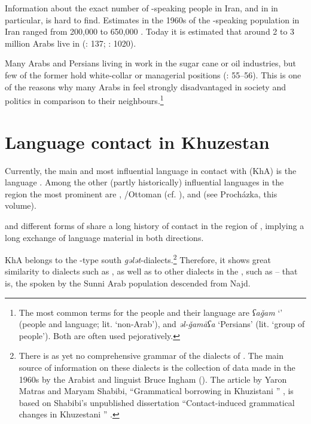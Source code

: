 \documentclass[output=paper,nonflat]{langsci/langscibook}
\begin{document}
In{formation} about the exact number of -speaking people in Iran, and in  in particular, is hard to find. Estimates in the 1960s of the -speaking population in Iran ranged from 200,000 to 650,000 \citep[216]{Oberling1986}. Today it is estimated that around 2 to 3 million Arabs live in  (\citealt{MatrasShabibi2007}: 137; \citealt{Gazsi2011}: 1020). 

Many Arabs and Persians living in  work in the sugar cane or oil industries, but few of the former hold white-collar or managerial positions (\citealt{DePlanhol1986}: 55–56). This is one of the reasons why many Arabs in  feel strongly disadvantaged in society and politics in comparison to their  neighbours.\footnote{The most common   terms for the  people and their language are \textit{ʕaǧam} ‘' (people and language; lit. `non-Arab'), and \textit{əl-ǧamāʕa} ‘Persians’ (lit. `group of people'). Both are often used pejoratively.} 

\section{Language contact in Khuzestan}

Currently, the main and most influential language in contact with   (KhA) is the   language . Among the other (partly historically) influential languages in the region the most prominent are , /Ottoman (cf. \citealt{Ingham2005}), and  (see Procházka, this volume).

 and different forms of  share a long history of contact in the region of , implying a long exchange of language material in both directions. 

KhA belongs to the -type south  \textit{gələt}-dialects.\footnote{There is as yet no comprehensive grammar of the dialects of . The main source of information on these dialects is the collection of data made in the 1960s by the Arabist and linguist Bruce Ingham (\citeyear{Ingham1973,Ingham1976,Ingham2011khuz}). The {article} by Yaron Matras and Maryam Shabibi, “Grammatical borrowing in Khuzistani ” \citep{MatrasShabibi2007}, is based on Shabibi’s unpublished dissertation “Contact-induced grammatical changes in Khuzestani ” \citep{Shabibi2006}.} Therefore, it shows great similarity to  dialects such as  , as well as to other dialects in the , such as    – that is, the  spoken by the Sunni Arab population descended from Najd. 
\end{document}
